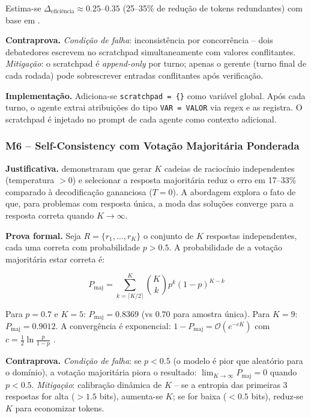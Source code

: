 \documentclass[5p]{elsarticle}
\theoremstyle{remark}
\begin{document}
Estima-se $\Delta_{\text{eficiência}} \approx 0.25$--$0.35$ (25--35\% de redução de tokens redundantes) com base em \cite{Mitra2024OrcaMath}.

\textbf{Contraprova.} \textit{Condição de falha}: inconsistência por concorrência -- dois debatedores escrevem no scratchpad simultaneamente com valores conflitantes. \textit{Mitigação}: o scratchpad é \textit{append-only} por turno; apenas o gerente (turno final de cada rodada) pode sobrescrever entradas conflitantes após verificação.

\textbf{Implementação.} Adiciona-se \texttt{scratchpad = \{\}} como variável global. Após cada turno, o agente extrai atribuições do tipo \texttt{VAR = VALOR} via regex e as registra. O scratchpad é injetado no prompt de cada agente como contexto adicional.

\subsubsection{M6 -- Self-Consistency com Votação Majoritária Ponderada}

\textbf{Justificativa.} \cite{Wang2022SelfConsistency} demonstraram que gerar $K$ cadeias de raciocínio independentes (temperatura $> 0$) e selecionar a resposta majoritária reduz o erro em 17--33\% comparado à decodificação gananciosa ($T=0$). A abordagem explora o fato de que, para problemas com resposta única, a moda das soluções converge para a resposta correta quando $K \to \infty$.

\textbf{Prova formal.} Seja $R = \{r_1, \ldots, r_K\}$ o conjunto de $K$ respostas independentes, cada uma correta com probabilidade $p > 0.5$. A probabilidade de a votação majoritária estar correta é:

\begin{equation}
P_{\text{maj}} = \sum_{k = \lceil K/2 \rceil}^{K} \binom{K}{k} p^k (1-p)^{K-k}
\label{eq:m6_majority}
\end{equation}

Para $p = 0.7$ e $K = 5$: $P_{\text{maj}} = 0.8369$ (vs $0.70$ para amostra única). Para $K = 9$: $P_{\text{maj}} = 0.9012$. A convergência é exponencial: $1 - P_{\text{maj}} = \mathcal{O}(e^{-cK})$ com $c = \frac{1}{2}\ln\frac{p}{1-p}$ \cite{Condorcet1785Essay}.

\textbf{Contraprova.} \textit{Condição de falha}: se $p < 0.5$ (o modelo é pior que aleatório para o domínio), a votação majoritária piora o resultado: $\lim_{K \to \infty} P_{\text{maj}} = 0$ quando $p < 0.5$. \textit{Mitigação}: calibração dinâmica de $K$ -- se a entropia das primeiras 3 respostas for alta ($> 1.5$ bits), aumenta-se $K$; se for baixa ($< 0.5$ bits), reduz-se $K$ para economizar tokens.
\end{document}
